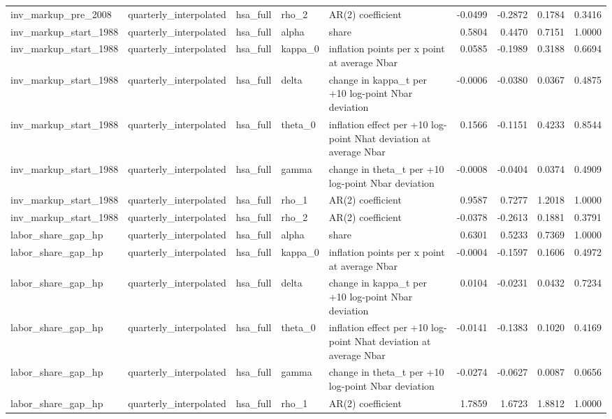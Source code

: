 \begin{tabular}{lllllrrrr}
inv\_markup\_pre\_2008 & quarterly\_interpolated & hsa\_full & rho\_2 & AR(2) coefficient & -0.0499 & -0.2872 & 0.1784 & 0.3416 \\
inv\_markup\_start\_1988 & quarterly\_interpolated & hsa\_full & alpha & share & 0.5804 & 0.4470 & 0.7151 & 1.0000 \\
inv\_markup\_start\_1988 & quarterly\_interpolated & hsa\_full & kappa\_0 & inflation points per x point at average Nbar & 0.0585 & -0.1989 & 0.3188 & 0.6694 \\
inv\_markup\_start\_1988 & quarterly\_interpolated & hsa\_full & delta & change in kappa\_t per +10 log-point Nbar deviation & -0.0006 & -0.0380 & 0.0367 & 0.4875 \\
inv\_markup\_start\_1988 & quarterly\_interpolated & hsa\_full & theta\_0 & inflation effect per +10 log-point Nhat deviation at average Nbar & 0.1566 & -0.1151 & 0.4233 & 0.8544 \\
inv\_markup\_start\_1988 & quarterly\_interpolated & hsa\_full & gamma & change in theta\_t per +10 log-point Nbar deviation & -0.0008 & -0.0404 & 0.0374 & 0.4909 \\
inv\_markup\_start\_1988 & quarterly\_interpolated & hsa\_full & rho\_1 & AR(2) coefficient & 0.9587 & 0.7277 & 1.2018 & 1.0000 \\
inv\_markup\_start\_1988 & quarterly\_interpolated & hsa\_full & rho\_2 & AR(2) coefficient & -0.0378 & -0.2613 & 0.1881 & 0.3791 \\
labor\_share\_gap\_hp & quarterly\_interpolated & hsa\_full & alpha & share & 0.6301 & 0.5233 & 0.7369 & 1.0000 \\
labor\_share\_gap\_hp & quarterly\_interpolated & hsa\_full & kappa\_0 & inflation points per x point at average Nbar & -0.0004 & -0.1597 & 0.1606 & 0.4972 \\
labor\_share\_gap\_hp & quarterly\_interpolated & hsa\_full & delta & change in kappa\_t per +10 log-point Nbar deviation & 0.0104 & -0.0231 & 0.0432 & 0.7234 \\
labor\_share\_gap\_hp & quarterly\_interpolated & hsa\_full & theta\_0 & inflation effect per +10 log-point Nhat deviation at average Nbar & -0.0141 & -0.1383 & 0.1020 & 0.4169 \\
labor\_share\_gap\_hp & quarterly\_interpolated & hsa\_full & gamma & change in theta\_t per +10 log-point Nbar deviation & -0.0274 & -0.0627 & 0.0087 & 0.0656 \\
labor\_share\_gap\_hp & quarterly\_interpolated & hsa\_full & rho\_1 & AR(2) coefficient & 1.7859 & 1.6723 & 1.8812 & 1.0000 \\

\end{tabular}
